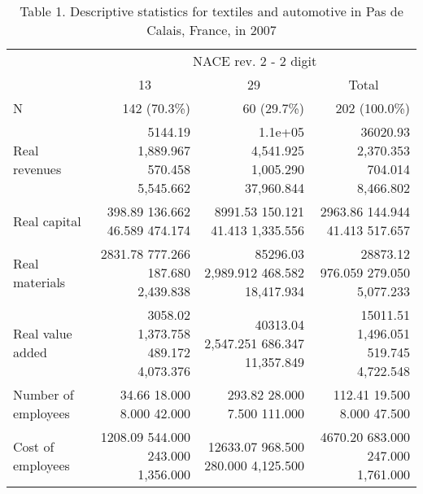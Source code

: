 \documentclass{article}
\begin{document}
\begin{table}[!h]
\caption{Table 1. Descriptive statistics for textiles and automotive in Pas de Calais, France, in 2007}
\centering
\begin{tabular}{llll}
\cline{1-4}
\multicolumn{1}{r}{} &
  \multicolumn{3}{c}{NACE rev. 2 - 2 digit} \\
\multicolumn{1}{r}{} &
  \multicolumn{1}{c}{13} &
  \multicolumn{1}{c}{29} &
  \multicolumn{1}{c}{Total} \\
\cline{1-4}
\multicolumn{1}{l}{N} &
  \multicolumn{1}{r}{142 (70.3\%)} &
  \multicolumn{1}{r}{60 (29.7\%)} &
  \multicolumn{1}{r}{202 (100.0\%)} \\
\multicolumn{1}{l}{Real revenues} &
  \multicolumn{1}{r}{5144.19 1,889.967 570.458 5,545.662} &
  \multicolumn{1}{r}{1.1e+05 4,541.925 1,005.290 37,960.844} &
  \multicolumn{1}{r}{36020.93 2,370.353 704.014 8,466.802} \\
\multicolumn{1}{l}{Real capital} &
  \multicolumn{1}{r}{398.89 136.662 46.589 474.174} &
  \multicolumn{1}{r}{8991.53 150.121 41.413 1,335.556} &
  \multicolumn{1}{r}{2963.86 144.944 41.413 517.657} \\
\multicolumn{1}{l}{Real materials} &
  \multicolumn{1}{r}{2831.78 777.266 187.680 2,439.838} &
  \multicolumn{1}{r}{85296.03 2,989.912 468.582 18,417.934} &
  \multicolumn{1}{r}{28873.12 976.059 279.050 5,077.233} \\
\multicolumn{1}{l}{Real value added} &
  \multicolumn{1}{r}{3058.02 1,373.758 489.172 4,073.376} &
  \multicolumn{1}{r}{40313.04 2,547.251 686.347 11,357.849} &
  \multicolumn{1}{r}{15011.51 1,496.051 519.745 4,722.548} \\
\multicolumn{1}{l}{Number of employees} &
  \multicolumn{1}{r}{34.66 18.000 8.000 42.000} &
  \multicolumn{1}{r}{293.82 28.000 7.500 111.000} &
  \multicolumn{1}{r}{112.41 19.500 8.000 47.500} \\
\multicolumn{1}{l}{Cost of employees} &
  \multicolumn{1}{r}{1208.09 544.000 243.000 1,356.000} &
  \multicolumn{1}{r}{12633.07 968.500 280.000 4,125.500} &
  \multicolumn{1}{r}{4670.20 683.000 247.000 1,761.000} \\
\cline{1-4}
\end{tabular}
\end{table}
\end{document}
